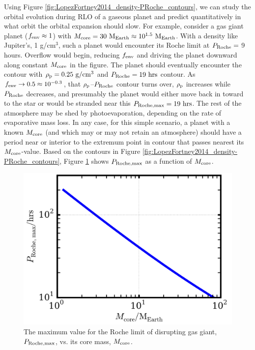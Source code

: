 \documentclass{svjour3}                     %
\begin{document}
Using Figure \ref{fig:LopezFortney2014_density-PRoche_contours}, we can study the orbital evolution during RLO of a gaseous planet and predict quantitatively in what orbit the orbital expansion should slow. For example, consider a gas giant planet ($f_{\rm env} \approx 1$) with $M_{\rm core} = 30\ {\rm M_{Earth}} \approx 10^{1.5}\ {\rm M_{Earth}}$. With a density like Jupiter's, 1 g/cm$^3$, such a planet would encounter its Roche limit at $P_{\rm Roche} =$ 9 hours. Overflow would begin, reducing $f_{\rm env}$ and driving the planet downward along constant $M_{\rm core}$ in the figure. The planet should eventually encounter the contour with $\rho_{\rm p} = 0.25\ {\rm g/cm^3}$ and $P_{\rm Roche} = 19\ {\rm hrs}$ contour. As $f_{\rm env} \rightarrow 0.5 \approx 10^{-0.3}$, that $\rho_{\rm p}$--$P_{\rm Roche}$ contour turns over, $\rho_{\rm p}$ increases while $P_{\rm Roche}$ decreases, and presumably the planet would either move back in toward to the star or would be stranded near this $P_{\rm Roche, max} = 19\ {\rm hrs}$. The rest of the atmosphere may be shed by photoevaporation, depending on the rate of evaporative mass loss. In any case, for this simple scenario, a planet with a known $M_{\rm core}$ (and which may or may not retain an atmosphere) should have a period near or interior to the extremum point in contour that passes nearest its $M_{\rm core}$-value. Based on the contours in Figure \ref{fig:LopezFortney2014_density-PRoche_contours}, Figure \ref{fig:PRoche-max_vs_Mcore} shows $P_{\rm Roche, max}$ as a function of $M_{\rm core}$. 

\begin{figure}
\includegraphics[width=\textwidth]{PRoche-max_vs_Mcore}
\caption{The maximum value for the Roche limit of disrupting gas giant, $P_{\rm Roche, max}$, vs. its core mass, $M_{\rm core}$.}
\label{fig:PRoche-max_vs_Mcore}
\end{figure}
\end{document}
